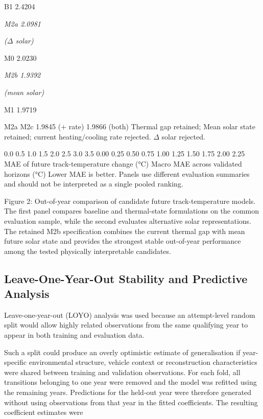 B1 2.4204

\begin{center}\textit{M2a                                                                        2.0981}\end{center}

\begin{center}\textit{(\ensuremath{\Delta} solar)}\end{center}

M0 2.0230

\begin{center}\textit{M2b                                                                    1.9392}\end{center}

\begin{center}\textit{(mean solar)}\end{center}

M1 1.9719

M2a M2c 1.9845 (+ rate) 1.9866 (both) Thermal gap retained; Mean solar state retained; current heating/cooling rate rejected. \ensuremath{\Delta} solar rejected.

0.0 0.5 1.0 1.5 2.0 2.5 3.0 3.5 0.00 0.25 0.50 0.75 1.00 1.25 1.50 1.75 2.00 2.25 MAE of future track-temperature change (°C) Macro MAE across validated horizons (°C) Lower MAE is better. Panels use different evaluation summaries and should not be interpreted as a single pooled ranking.

Figure 2: Out-of-year comparison of candidate future track-temperature models. The first panel compares baseline and thermal-state formulations on the common evaluation sample, while the second evaluates alternative solar representations. The retained M2b specification combines the current thermal gap with mean future solar state and provides the strongest stable out-of-year performance among the tested physically interpretable candidates.

\subsection{Leave-One-Year-Out Stability and Predictive Analysis}
Leave-one-year-out (LOYO) analysis was used because an attempt-level random split would allow highly related observations from the same qualifying year to appear in both training and evaluation data.

Such a split could produce an overly optimistic estimate of generalisation if year-specific environmental structure, vehicle context or reconstruction characteristics were shared between training and validation observations. For each fold, all transitions belonging to one year were removed and the model was refitted using the remaining years. Predictions for the held-out year were therefore generated without using observations from that year in the fitted coefficients. The resulting coefficient estimates were

